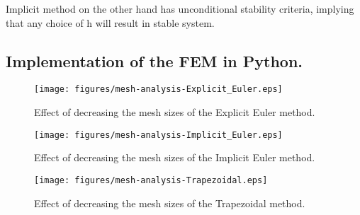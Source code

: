 \documentclass{article}
\begin{document}
Implicit method on the other hand has unconditional stability criteria, implying that any choice of h will result in stable system.





\subsection{Implementation of the FEM in Python.}%
\label{sub:Implementation of the FEM in Python.}
\begin{figure}[H]
  \centering
  \texttt{[image: figures/mesh-analysis-Explicit\_Euler.eps]}
  \caption{Effect of decreasing the mesh sizes of the Explicit Euler method.}
  \label{fig:figures-mesh-analysis-Explicit_Euler-eps}
\end{figure}

\begin{figure}[H]
  \centering
  \texttt{[image: figures/mesh-analysis-Implicit\_Euler.eps]}
  \caption{Effect of decreasing the mesh sizes of the Implicit Euler method.}
  \label{fig:figures-mesh-analysis-Implicit_Euler-eps}
\end{figure}

\begin{figure}[H]
  \centering
  \texttt{[image: figures/mesh-analysis-Trapezoidal.eps]}
  \caption{Effect of decreasing the mesh sizes of the Trapezoidal method.}
  \label{fig:figures-mesh-analysis-Trapezoidal-eps}
\end{figure}
\end{document}
